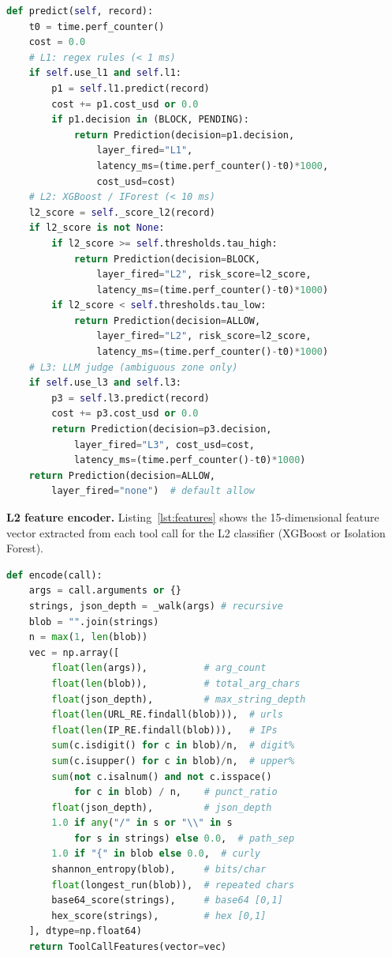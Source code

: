 \documentclass[sigconf]{acmart}
\begin{document}
\begin{lstlisting}[caption={Cascade pipeline: L1$\to$L2$\to$L3 short-circuit.},label=lst:cascade,language=Python]
def predict(self, record):
    t0 = time.perf_counter()
    cost = 0.0
    # L1: regex rules (< 1 ms)
    if self.use_l1 and self.l1:
        p1 = self.l1.predict(record)
        cost += p1.cost_usd or 0.0
        if p1.decision in (BLOCK, PENDING):
            return Prediction(decision=p1.decision,
                layer_fired="L1",
                latency_ms=(time.perf_counter()-t0)*1000,
                cost_usd=cost)
    # L2: XGBoost / IForest (< 10 ms)
    l2_score = self._score_l2(record)
    if l2_score is not None:
        if l2_score >= self.thresholds.tau_high:
            return Prediction(decision=BLOCK,
                layer_fired="L2", risk_score=l2_score,
                latency_ms=(time.perf_counter()-t0)*1000)
        if l2_score < self.thresholds.tau_low:
            return Prediction(decision=ALLOW,
                layer_fired="L2", risk_score=l2_score,
                latency_ms=(time.perf_counter()-t0)*1000)
    # L3: LLM judge (ambiguous zone only)
    if self.use_l3 and self.l3:
        p3 = self.l3.predict(record)
        cost += p3.cost_usd or 0.0
        return Prediction(decision=p3.decision,
            layer_fired="L3", cost_usd=cost,
            latency_ms=(time.perf_counter()-t0)*1000)
    return Prediction(decision=ALLOW,
        layer_fired="none")  # default allow
\end{lstlisting}

\noindent\textbf{L2 feature encoder.}
Listing~\ref{lst:features} shows the 15-dimensional feature vector extracted from each tool call for the L2 classifier (XGBoost or Isolation Forest).

\begin{lstlisting}[caption={Feature encoder: 15-dim vector for L2.},label=lst:features,language=Python]
def encode(call):
    args = call.arguments or {}
    strings, json_depth = _walk(args) # recursive
    blob = "".join(strings)
    n = max(1, len(blob))
    vec = np.array([
        float(len(args)),          # arg_count
        float(len(blob)),          # total_arg_chars
        float(json_depth),         # max_string_depth
        float(len(URL_RE.findall(blob))),  # urls
        float(len(IP_RE.findall(blob))),   # IPs
        sum(c.isdigit() for c in blob)/n,  # digit%
        sum(c.isupper() for c in blob)/n,  # upper%
        sum(not c.isalnum() and not c.isspace()
            for c in blob) / n,    # punct_ratio
        float(json_depth),         # json_depth
        1.0 if any("/" in s or "\\" in s
            for s in strings) else 0.0,  # path_sep
        1.0 if "{" in blob else 0.0,  # curly
        shannon_entropy(blob),     # bits/char
        float(longest_run(blob)),  # repeated chars
        base64_score(strings),     # base64 [0,1]
        hex_score(strings),        # hex [0,1]
    ], dtype=np.float64)
    return ToolCallFeatures(vector=vec)
\end{lstlisting}
\end{document}
